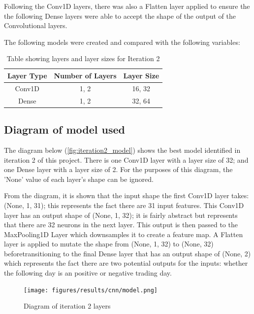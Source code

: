 Following the Conv1D layers, there was also a Flatten layer applied to ensure the the following Dense layers
were able to accept the shape of the output of the Convolutional layers.

The following models were created and compared with the following variables:

\begin{table}[ht]
    \centering
    \begin{tabular}{|c|c|c|}
        \hline
        Layer Type & Number of Layers & Layer Size \\
        \hline\hline
        Conv1D & 1, 2 & 16, 32 \\
        Dense & 1, 2 & 32, 64 \\
        \hline
    \end{tabular}
    \caption{Table showing layers and layer sizes for Iteration 2}
    \label{tab:iteration2_layers}
\end{table}
\FloatBarrier

\subsection{Diagram of model used}
The diagram below (\autoref{fig:iteration2_model}) shows the best model identified in iteration 2 of this project.
There is one Conv1D layer with a layer size of 32; and one Dense layer with a layer size of 2.
For the purposes of this diagram, the 'None' value of each layer's shape can be ignored.

From the diagram, it is shown that the input shape the first Conv1D layer takes: (None, 1, 31); this represents the
fact there are 31 input features.  This Conv1D layer has an output shape of (None, 1, 32); it is fairly abstract
but represents that there are 32 neurons in the next layer. This output is then passed to the MaxPooling1D Layer
which downsamples it to create a feature map. A Flatten layer is applied to mutate the shape from (None, 1, 32) to 
(None, 32) beforetransitioning to the final Dense layer that has an output shape of (None, 2)
which represents the fact there are two potential outputs for the inputs: whether the following day
is an positive or negative trading day.

\begin{figure}[ht]
    \centering
    \texttt{[image: figures/results/cnn/model.png]}
    \caption[Diagram of iteration 2 layers]{Diagram of iteration 2 layers}
    \label{fig:iteration2_model}
\end{figure}
\FloatBarrier